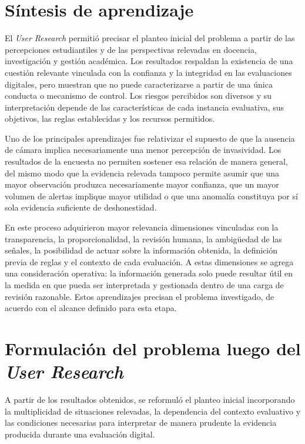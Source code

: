 \section{Síntesis de aprendizaje}

El \textit{User Research} permitió precisar el planteo inicial del problema a partir de las percepciones estudiantiles y de las perspectivas relevadas en docencia, investigación y gestión académica. Los resultados respaldan la existencia de una cuestión relevante vinculada con la confianza y la integridad en las evaluaciones digitales, pero muestran que no puede caracterizarse a partir de una única conducta o mecanismo de control. Los riesgos percibidos son diversos y su interpretación depende de las características de cada instancia evaluativa, sus objetivos, las reglas establecidas y los recursos permitidos.

Uno de los principales aprendizajes fue relativizar el supuesto de que la ausencia de cámara implica necesariamente una menor percepción de invasividad. Los resultados de la encuesta no permiten sostener esa relación de manera general, del mismo modo que la evidencia relevada tampoco permite asumir que una mayor observación produzca necesariamente mayor confianza, que un mayor volumen de alertas implique mayor utilidad o que una anomalía constituya por sí sola evidencia suficiente de deshonestidad.

En este proceso adquirieron mayor relevancia dimensiones vinculadas con la transparencia, la proporcionalidad, la revisión humana, la ambigüedad de las señales, la posibilidad de actuar sobre la información obtenida, la definición previa de reglas y el contexto de cada evaluación. A estas dimensiones se agrega una consideración operativa: la información generada solo puede resultar útil en la medida en que pueda ser interpretada y gestionada dentro de una carga de revisión razonable. Estos aprendizajes precisan el problema investigado, de acuerdo con el alcance definido para esta etapa.

\section{Formulación del problema luego del \textit{User Research}}

A partir de los resultados obtenidos, se reformuló el planteo inicial incorporando la multiplicidad de situaciones relevadas, la dependencia del contexto evaluativo y las condiciones necesarias para interpretar de manera prudente la evidencia producida durante una evaluación digital.


